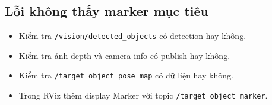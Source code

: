 \subsection*{Lỗi không thấy marker mục tiêu}
\begin{itemize}
    \item Kiểm tra \texttt{/vision/detected\_objects} có detection hay không.
    \item Kiểm tra ảnh depth và camera info có publish hay không.
    \item Kiểm tra \texttt{/target\_object\_pose\_map} có dữ liệu hay không.
    \item Trong RViz thêm display Marker với topic \texttt{/target\_object\_marker}.
\end{itemize}

